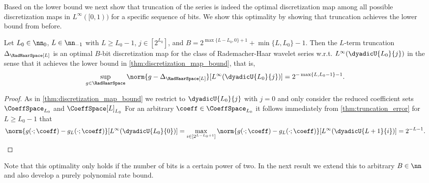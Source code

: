 \documentclass[twoside,11pt]{article}
\begin{document}
Based on the lower bound we next show that truncation of the series is indeed the optimal discretization map among all possible discretization maps in $L^\infty([0,1))$ for a specific sequence of bits.
We show this optimality by showing that truncation achieves the lower bound from before.
\begin{theorem}
\label{thm:optimal_codec}
    Let $L_0\in\nn_0$, $L\in\nn_{-1}$ with $L\geq L_0-1$, $j\in[2^{L_0}]$, and $B=2^{\max\{L-L_0,0\}+1}+\min\{L,L_0\}-1$.
    Then the $L$-term truncation $\Delta_{\RadHaarSpace[L]}$ is an optimal $B$-bit discretization map for the class of Rademacher-Haar wavelet series w.r.t. $L^\infty(\dyadicU{L_0}{j})$ in the sense that it achieves the lower bound in \cref{thm:discretization_map_bound}, that is,
    \begin{align}
        \sup_{g\in\RadHaarSpace}\norm{g-\Delta_{\RadHaarSpace[L]}}[{L^\infty(\dyadicU{L_0}{j})}]=2^{-\max\{L,L_0-1\}-1}.
    \end{align}
\end{theorem}
\begin{proof}
    As in \cref{thm:discretization_map_bound} we restrict to $\dyadicU{L_0}{j}$ with $j=0$ and only consider the reduced coefficient sets $\CoeffSpace_{L_0}$ and $\CoeffSpace[L]_{L_0}$
    For an arbitrary $\coeff\in\CoeffSpace_{L_0}$ 
    it follows immediately from \cref{thm:truncation_error} for $L\geq L_0-1$ that
    \begin{align}
        \norm{g(\cdot;\coeff)-g_L(\cdot;\coeff)}[{L^\infty(\dyadicU{L_0}{0})}]=
        \max_{i\in[2^{L-L_0+1}]}\norm{g(\cdot;\coeff)-g_L(\cdot;\coeff)}[{L^\infty(\dyadicU{L+1}{i})}]
        =
        2^{-L-1}.
    \end{align}
\end{proof}

Note that this optimality only holds if the number of bits is a certain power of two.
In the next result we extend this to arbitrary $B\in \nn$ and also develop a purely polynomial rate bound.
\end{document}
